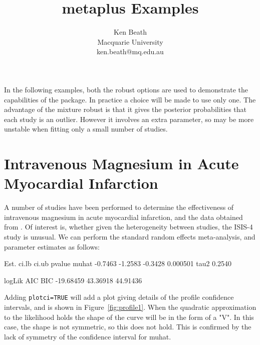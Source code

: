 \documentclass{article}
\title{metaplus Examples}
\author{Ken Beath\\Macquarie University\\ken.beath@mq.edu.au}
\begin{document}
\maketitle



In the following examples, both the robust options are used to demonstrate the capabilities of the package. In practice a choice will be made to use only one. The advantage of the mixture robust is that it gives the posterior probabilities that each study is an outlier. However it involves an extra parameter, so may be more unstable when fitting only a small number of studies.

\section{Intravenous Magnesium in Acute Myocardial Infarction}

A number of studies have been performed to determine the effectiveness of intravenous magnesium in acute myocardial infarction, and the data obtained from \cite{Sterne2001}. Of interest is, whether given the heterogeneity between studies, the ISIS-4 study is unusual.
We can perform the standard random effects meta-analysis, and parameter estimates as follows:
\begin{Schunk}
\begin{Soutput}
         Est.   ci.lb   ci.ub   pvalue
muhat -0.7463 -1.2583 -0.3428 0.000501
tau2   0.2540                         

     logLik      AIC      BIC
  -19.68459 43.36918 44.91436
\end{Soutput}
\end{Schunk}

Adding \texttt{plotci=TRUE} will add a plot giving details of the profile confidence intervals, and is shown in Figure~\ref{fig:profile1}. When the quadratic approximation to the likelihood holds the shape of the curve will be in the form of a "V". In this case, the shape is not symmetric, so this does not hold. This is confirmed by the lack of symmetry of the confidence interval for muhat. 
\end{document}

